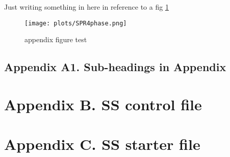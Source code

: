 \documentclass[12pt,]{article}
\begin{document}
\renewcommand{\thepage}{A-\arabic{page}}
\renewcommand{\thefigure}{A\arabic{figure}}
\renewcommand{\thetable}{A\arabic{table}}

\setcounter{page}{1} \setcounter{figure}{1} \setcounter{table}{1}

Just writing something in here in reference to a fig \ref{appendfig}

\begin{figure}[htbp]
\centering
\texttt{[image: plots/SPR4phase.png]}
\caption{appendix figure test \label{appendfig}}
\end{figure}

\newpage 

\subsection*{Appendix A1. Sub-headings in
Appendix}\label{appendix-a1.-sub-headings-in-appendix}

\renewcommand{\thepage}{A1-\arabic{page}}
\renewcommand{\thefigure}{A1.\arabic{figure}}
\renewcommand{\thetable}{A1.\arabic{table}}

\setcounter{page}{1} \setcounter{figure}{1} \setcounter{table}{1}

\newpage

\section*{Appendix B. SS control
file}\label{appendix-b.-ss-control-file}

\renewcommand{\thepage}{B-\arabic{page}}
\renewcommand{\thefigure}{B\arabic{figure}}
\renewcommand{\thetable}{B\arabic{table}}

\setcounter{page}{1} \setcounter{figure}{1} \setcounter{table}{1}

\newpage

\section*{Appendix C. SS starter
file}\label{appendix-c.-ss-starter-file}

\renewcommand{\thepage}{C-\arabic{page}}
\renewcommand{\thefigure}{C\arabic{figure}}
\renewcommand{\thetable}{C\arabic{table}}

\setcounter{page}{1} \setcounter{figure}{1} \setcounter{table}{1}
\end{document}
